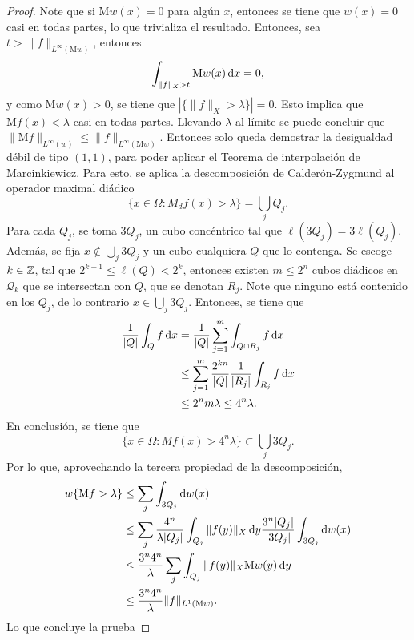 \begin{proof}
	Note que si $\mathrm{M}w(x) = 0$ para algún $x$, entonces se tiene que $w(x)=0$ casi en todas partes, lo que trivializa el resultado. Entonces, sea $t > \|f\|_{L^\infty(\mathrm{M}w)}$, entonces 
	\begin{equation*}
		\int_{\|f\|_X > t} \mathrm{M}w(x) \mathop{}\!\mathrm{d} x = 0,
	\end{equation*}
	y como $\mathrm{M}w(x) > 0$, se tiene que $|\{\|f\|_X > \lambda\}| = 0$. Esto implica que $\mathrm{M}f(x) < \lambda$ casi en todas partes. Llevando $\lambda$ al límite se puede concluir que $\|\mathrm{M}f\|_{L^\infty(w)} \leq \|f\|_{L^\infty(\mathrm{M}w)}$. Entonces solo queda demostrar la desigualdad débil de tipo $(1,1)$, para poder aplicar el Teorema de interpolación de Marcinkiewicz. Para esto, se aplica la descomposición de Calderón-Zygmund al operador maximal diádico
	\begin{equation*}
		\{x\in\Omega:M_df(x)>\lambda\} = \bigcup_jQ_j.
	\end{equation*}
	Para cada $Q_j$, se toma $3Q_j$, un cubo concéntrico tal que $\ell(3Q_j) = 3\ell(Q_j)$. Además, se fija $x \notin \bigcup_j 3Q_j$ y un cubo cualquiera $Q$ que lo contenga. Se escoge $k\in\mathbb{Z}$, tal que $2^{k-1}\leq\ell(Q)<2^k$, entonces existen $m\leq 2^n$ cubos diádicos en $\mathcal{Q}_k$ que se intersectan con $Q$, que se denotan $R_j$. Note que ninguno está contenido en los $Q_j$, de lo contrario $x\in \bigcup_j 3Q_j$. Entonces, se tiene que 
	\begin{align*}
		\frac{1}{|Q|} \int_Q f \mathop{}\!\mathrm{d} x &= \frac{1}{|Q|}\sum_{j=1}^m \int_{Q\cap R_j} f \mathop{}\!\mathrm{d} x \\
		& \leq \sum_{j=1}^m \frac{2^{kn}}{|Q|}\frac{1}{|R_j|}\int_{R_j} f\mathop{}\!\mathrm{d} x \\
		& \leq 2^nm\lambda \leq 4^n\lambda.
	\end{align*}
	En conclusión, se tiene que 
	\begin{equation*}
		\{x\in\Omega:Mf(x)>4^n\lambda\} \subset \bigcup_j3Q_j.
	\end{equation*}
	Por lo que, aprovechando la tercera propiedad de la descomposición,
	\begin{align*}
		w\{\mathrm{M}f>\lambda\} & \leq \sum_j \int_{3Q_j} \mathop{}\!\mathrm{d} w(x)\\
		& \leq \sum_j \frac{4^n}{\lambda |Q_j|} \int_{Q_j} \|f(y)\|_X \mathop{}\!\mathrm{d} y\frac{3^n|Q_j|}{|3Q_j|}
		\int_{3Q_j} \mathop{}\!\mathrm{d} w(x) \\
		& \leq \frac{3^n4^n}{\lambda} \sum_j \int_{Q_j} \|f(y)\|_X \mathrm{M}w(y) \mathop{}\!\mathrm{d} y\\
		& \leq \frac{3^n4^n}{\lambda}  \|f\|_{L^1(\mathrm{M}w)}.
	\end{align*}
	Lo que concluye la prueba
\end{proof}
